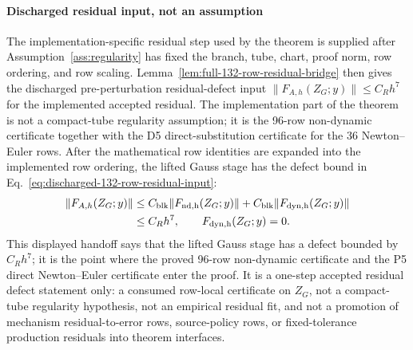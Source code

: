 \documentclass[preprint,12pt]{elsarticle}
\begin{document}
\paragraph{Discharged residual input, not an assumption}
The implementation-specific residual step used by the theorem is supplied
after Assumption~\ref{ass:regularity} has fixed the branch, tube, chart,
proof norm, row ordering, and row scaling. Lemma~\ref{lem:full-132-row-residual-bridge}
then gives the discharged pre-perturbation residual-defect input
\(\|F_{A,h}(Z_G;y)\|\le C_Rh^7\) for the implemented accepted residual.
The implementation part of the theorem is not a
compact-tube regularity assumption; it is the 96-row non-dynamic certificate
together with the D5 direct-substitution certificate for the 36
Newton--Euler rows. After the mathematical row identities are expanded into
the implemented row ordering, the lifted Gauss stage has the defect bound in
Eq.~\eqref{eq:discharged-132-row-residual-input}:
\begin{equation}
\label{eq:discharged-132-row-residual-input}
  \begin{aligned}
  \|F_{A,h}(Z_G;y)\|
  &\le C_{\rm blk}\|F_{\rm nd,h}(Z_G;y)\|
     + C_{\rm blk}\|F_{\rm dyn,h}(Z_G;y)\| \\
  &\le C_R h^7,
  \qquad F_{\rm dyn,h}(Z_G;y)=0 .
  \end{aligned}
\end{equation}
This displayed handoff says that the lifted Gauss stage has a defect bounded by
$C_R h^7$; it is the point where the proved 96-row non-dynamic certificate and
the P5 direct Newton--Euler certificate enter the proof. It is a one-step
accepted residual defect statement only: a
consumed row-local certificate on \(Z_G\), not a compact-tube regularity
hypothesis, not an empirical residual fit, and not a promotion of mechanism
residual-to-error rows, source-policy rows, or fixed-tolerance production
residuals into theorem interfaces.
\end{document}
